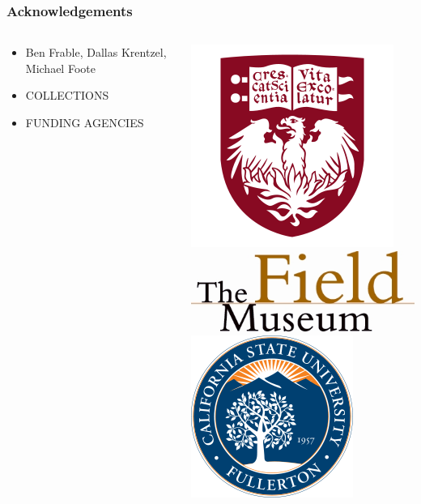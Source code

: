\documentclass{beamer}\usepackage{graphicx, color}
\begin{document}
\begin{frame}
  \frametitle{Acknowledgements}
  \begin{columns}
    \begin{column}{0.5\textwidth}
      \begin{itemize}
        \item Ben Frable, Dallas Krentzel, Michael Foote
        \item COLLECTIONS
        \item FUNDING AGENCIES
      \end{itemize}
    \end{column}
    \begin{column}{0.5\textwidth}
      \includegraphics[height = 0.25\textheight, keepaspectratio = true]{figure/chicago} \\
      \includegraphics[height = 0.25\textheight, width = \textwidth, keepaspectratio = true]{figure/field} \\
      \includegraphics[height = 0.25\textheight, keepaspectratio = true]{figure/csu}
    \end{column}
  \end{columns}
\end{frame}
\end{document}
